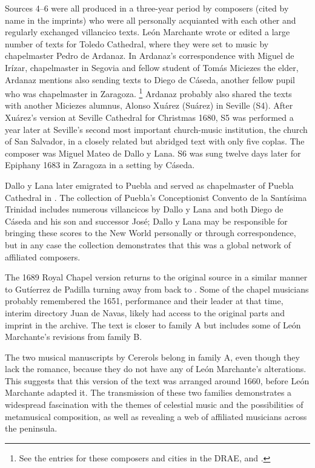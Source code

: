 Sources 4--6 were all produced in a three-year period by composers (cited by
name in the imprints) who were all personally acquianted with each other and
regularly exchanged villancico texts.
León Marchante wrote or edited a large number of texts for Toledo Cathedral,
where they were set to music by chapelmaster Pedro de Ardanaz.
In Ardanaz's correspondence with Miguel de Irízar, chapelmaster in Segovia and
fellow student of Tomás Miciezes the elder, Ardanaz mentions also sending texts
to Diego de Cáseda, another fellow pupil who was chapelmaster in Zaragoza.%
    \footnote{See the entries for these composers and cities in the DRAE, and
    \autocite[ch. 5]{Cashner:PhD}.}
Ardanaz probably also shared the texts with another Miciezes alumnus, Alonso
Xuárez (Suárez) in Seville (S4).
After Xuárez's version at Seville Cathedral for Christmas 1680, S5 was performed
a year later at Seville's second most important church-music institution, the
church of San Salvador, in a closely related but abridged text with only five
coplas.
The composer was Miguel Mateo de Dallo y Lana.
S6 was sung twelve days later for Epiphany 1683 in Zaragoza in a setting by
Cáseda.

Dallo y Lana later emigrated to Puebla and served as chapelmaster of Puebla
Cathedral in \XXX[years].%
The collection of Puebla's Conceptionist Convento de la Santísima Trinidad
includes numerous villancicos by Dallo y Lana and both Diego de Cáseda and his
son and successor José; Dallo y Lana may be responsible for bringing these
scores to the New World personally or through correspondence, but in any case
the collection demonstrates that this was a global network of affiliated
composers.%

The 1689 Royal Chapel version returns to the original source in a similar manner
to Gutíerrez de Padilla turning away from  back to
.
Some of the chapel musicians probably remembered the 1651, performance and their
leader at that time, interim directory Juan de Navas, likely had access to the
original parts and imprint in the archive.%
The text is closer to family A but includes some of León Marchante's
revisions from family B.

The two musical manuscripts by Cererols belong in family A, even though they
lack the romance, because they do not have any of León Marchante's
alterations.
This suggests that this version of the text was arranged around 1660, before
León Marchante adapted it.
The transmission of these two families demonstrates a widespread fascination
with the themes of celestial music and the possibilities of metamusical
composition, as well as revealing a web of affiliated musicians across the
peninsula.

